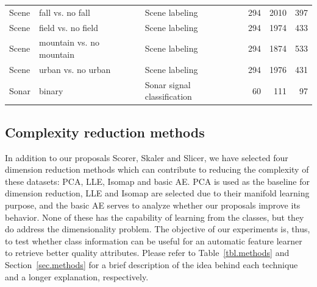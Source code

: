 \documentclass[
	fontsize=11pt, %
	twoside=false, %
	open=any, %
	secnumdepth=1, %
]{kaobook}
\begin{document}
\begin{table}[hbtp]
\begin{tabular}{p{2.5cm}p{3.5cm}p{5.2cm}rrr}
      Scene \cite{boutell2004learning}                           & fall vs. no fall          & Scene labeling                            & 294       & 2010      & 397       \\
      Scene \cite{boutell2004learning}                           & field vs. no field        & Scene labeling                            & 294       & 1974      & 433       \\
      Scene \cite{boutell2004learning}                           & mountain vs. no mountain  & Scene labeling                            & 294       & 1874      & 533       \\
      Scene \cite{boutell2004learning}                           & urban vs. no urban        & Scene labeling                            & 294       & 1976      & 431       \\
      Sonar \cite{gorman1988analysis}                            & binary                    & Sonar signal classification               & 60        & 111       & 97
      \\   \bottomrule
    \end{tabular}
  \end{table}

\fi

\subsection{Complexity reduction methods}

In addition to our proposals Scorer, Skaler and Slicer, we have selected four dimension reduction methods which can contribute to reducing the complexity of these datasets: PCA, LLE, Isomap and basic AE. PCA is used as the baseline for dimension reduction, LLE and Isomap are selected due to their manifold learning purpose, and the basic AE serves to analyze whether our proposals improve its behavior. None of these has the capability of learning from the classes, but they do address the dimensionality problem. The objective of our experiments is, thus, to test whether class information can be useful for an automatic feature learner to retrieve better quality attributes. Please refer to Table~\ref{tbl.methods} and Section~\ref{sec.methods} for a brief description of the idea behind each technique and a longer explanation, respectively.
\end{document}
